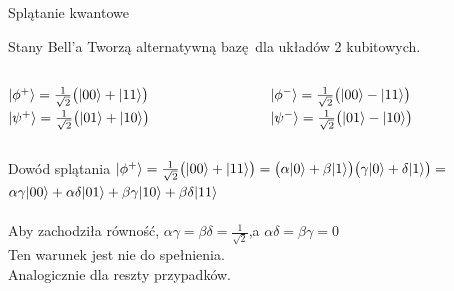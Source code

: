 \documentclass{beamer}
\DeclarePairedDelimiter\ket{\lvert}{\rangle}
\begin{document}
	\begin{frame}{Splątanie kwantowe}
		
		\begin{block}{Stany Bell'a}
			\vspace{0.5em}
			Tworzą alternatywną bazę dla układów 2 kubitowych.
			\vspace{0.5em}
			\begin{columns}
				\begin{column}{0.5\textwidth}
					\begin{center}
						$\ket{\phi^{+}}=\frac{1}{\sqrt{2}}\big(\ket{00} + \ket{11} \big)$\\	
						$\ket{\psi^{+}}=\frac{1}{\sqrt{2}}\big(\ket{01} + \ket{10} \big)$\\
					\end{center}
				\end{column}
				
				\begin{column}{0.5\textwidth}
					\begin{center}
							$\ket{\phi^{-}}=\frac{1}{\sqrt{2}}\big(\ket{00} - \ket{11} \big)$\\
							$\ket{\psi^{-}}=\frac{1}{\sqrt{2}}\big(\ket{01} - \ket{10} \big)$\\
					\end{center}	
				\end{column}
			\end{columns}
		\end{block}
	
		\begin{block}{Dowód splątania}
			\vspace{0.5em}
			$\ket{\phi^{+}}=\frac{1}{\sqrt{2}}\big(\ket{00} + \ket{11} \big)=\big(\alpha\ket{0}+\beta\ket{1}\big)
			\big(\gamma\ket{0}+\delta\ket{1}\big)=
		 	$ \centering $\alpha\gamma\ket{00}+\alpha\delta\ket{01}+\beta\gamma\ket{10}+\beta\delta\ket{11}$\\~\\
		 	Aby zachodziła równość, $\alpha\gamma=\beta\delta=\frac{1}{\sqrt{2}}$,a  $\alpha\delta=\beta\gamma=0$\\
		 	Ten warunek jest nie do spełnienia.\\Analogicznie dla reszty przypadków.
			\vspace{0.5em}
		\end{block}	
	\end{frame}
	
\end{document}
